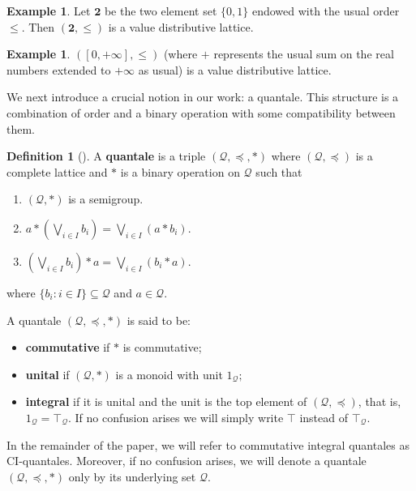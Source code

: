 \documentclass[11pt,a4paper]{amsart}
\theoremstyle{definition}
\newtheorem{definition}[theorem]{Definition}
\newtheorem{example}[theorem]{Example}
\begin{document}
	
	\begin{example}
		Let $\mathbf{2}$ be the two element set $\{0,1\}$ endowed with the usual order $\leq.$ Then $(\mathbf{2},\leq)$ is a value distributive lattice.
	\end{example}
	
	\begin{example}\label{ex:0infinito}
		$([0,+\infty],\leq)$ (where $+$ represents the usual sum on the real numbers extended to $+\infty$ as usual) is a value distributive lattice.
	\end{example}
	
	We next introduce a crucial notion in our work: a quantale. This structure is a combination of order and a binary operation with some compatibility between them.
	
	\begin{definition}[\cite{BookQuantales}]
		A \textbf{quantale} is a triple $(\mathscr{Q},\preceq,\ast)$ where $(\mathscr{Q},\preceq)$ is a complete lattice and $\ast$ is a binary operation on $\mathscr{Q}$ such that
		\begin{enumerate}[(q1)]
			\item\label{quantal: semigroup} $(\mathscr{Q},\ast)$ is a semigroup.
			\item\label{quantal: right distributive} $a\ast(\bigvee_{i\in I}b_i)=\bigvee_{i\in I}(a\ast b_i)$.
			\item\label{quantal: left distributive} $(\bigvee_{i\in I}b_i)\ast a=\bigvee_{i\in I}(b_i\ast a)$.
		\end{enumerate}
		
		\noindent where $\{b_i:i\in I\}\subseteq\mathscr{Q}$  and $a\in\mathscr{Q}.$ \medskip
		
		\noindent A quantale $(\mathscr{Q},\preceq,\ast)$ is said to be:
		\begin{itemize}
			\item \textbf{commutative} if $\ast$ is commutative;
			\item \textbf{unital} if  $(\mathscr{Q},\ast)$ is a monoid with unit $1_\mathscr{Q};$
			\item  \textbf{integral} if it is unital and the unit is the top element of $(\mathscr{Q},\preceq)$, that is, $1_\mathscr{Q}=\top_{\mathscr{Q}}.$ If no confusion arises we will simply write $\top$ instead of $\top_{\mathscr{Q}}.$
		\end{itemize}	
	\end{definition}
	
	In the remainder of the paper, we will refer to commutative integral quantales as CI-quantales. Moreover, if no confusion arises, we will denote a quantale $(\mathscr{Q},\preceq,\ast)$ only by its underlying set $\mathscr{Q}.$
	
\end{document}
